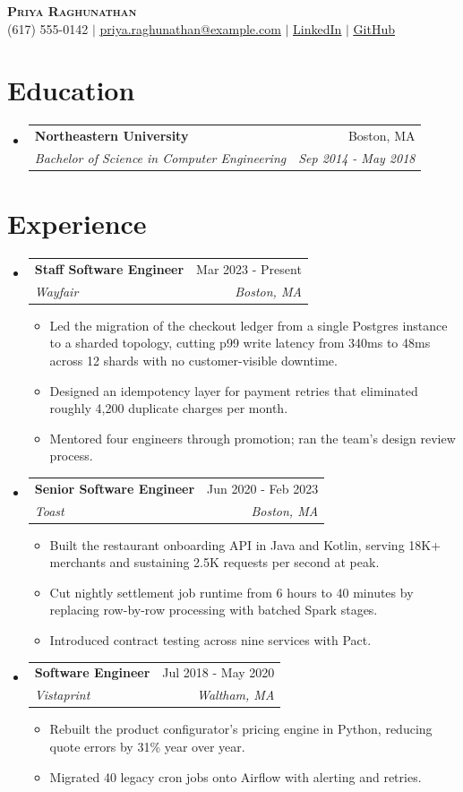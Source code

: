 \documentclass[letterpaper,11pt]{article}
\makeatletter
\newcommand{\resumeItem}[1]{
  \item\small{
    {#1 \vspace{-2pt}}
  }
}
\newcommand{\resumeSubheading}[4]{
  \vspace{-2pt}\item
    \begin{tabular*}{0.97\textwidth}[t]{l@{\extracolsep{\fill}}r}
      \textbf{#1} & #2 \\
      \textit{\small#3} & \textit{\small #4} \\
    \end{tabular*}\vspace{-7pt}
}
\newcommand{\resumeSubHeadingListStart}{\begin{itemize}[leftmargin=0.15in, label={}]}
\newcommand{\resumeSubHeadingListEnd}{\end{itemize}}
\newcommand{\resumeItemListStart}{\begin{itemize}}
\newcommand{\resumeItemListEnd}{\end{itemize}\vspace{-5pt}}
\makeatother
\begin{document}

\begin{center}
    \textbf{\Huge \scshape Priya Raghunathan} \\ \vspace{1pt}
    \small (617) 555-0142 $|$ \href{mailto:priya.raghunathan@example.com}{\underline{priya.raghunathan@example.com}} $|$ \href{linkedin.com/in/priyaraghunathan}{\underline{LinkedIn}} $|$ \href{github.com/praghunathan}{\underline{GitHub}}
\end{center}

\section{Education}
  \resumeSubHeadingListStart
    \resumeSubheading
      {Northeastern University}{Boston, MA}
      {Bachelor of Science in Computer Engineering}{Sep 2014 - May 2018}
  \resumeSubHeadingListEnd

\section{Experience}
  \resumeSubHeadingListStart
    \resumeSubheading
      {Staff Software Engineer}{Mar 2023 - Present}
      {Wayfair}{Boston, MA}
      \resumeItemListStart
        \resumeItem{Led the migration of the checkout ledger from a single Postgres instance to a sharded topology, cutting p99 write latency from 340ms to 48ms across 12 shards with no customer-visible downtime.}
        \resumeItem{Designed an idempotency layer for payment retries that eliminated roughly 4,200 duplicate charges per month.}
        \resumeItem{Mentored four engineers through promotion; ran the team's design review process.}
      \resumeItemListEnd
    \resumeSubheading
      {Senior Software Engineer}{Jun 2020 - Feb 2023}
      {Toast}{Boston, MA}
      \resumeItemListStart
        \resumeItem{Built the restaurant onboarding API in Java and Kotlin, serving 18K+ merchants and sustaining 2.5K requests per second at peak.}
        \resumeItem{Cut nightly settlement job runtime from 6 hours to 40 minutes by replacing row-by-row processing with batched Spark stages.}
        \resumeItem{Introduced contract testing across nine services with Pact.}
      \resumeItemListEnd
    \resumeSubheading
      {Software Engineer}{Jul 2018 - May 2020}
      {Vistaprint}{Waltham, MA}
      \resumeItemListStart
        \resumeItem{Rebuilt the product configurator's pricing engine in Python, reducing quote errors by 31\% year over year.}
        \resumeItem{Migrated 40 legacy cron jobs onto Airflow with alerting and retries.}
      \resumeItemListEnd
  \resumeSubHeadingListEnd
\end{document}
